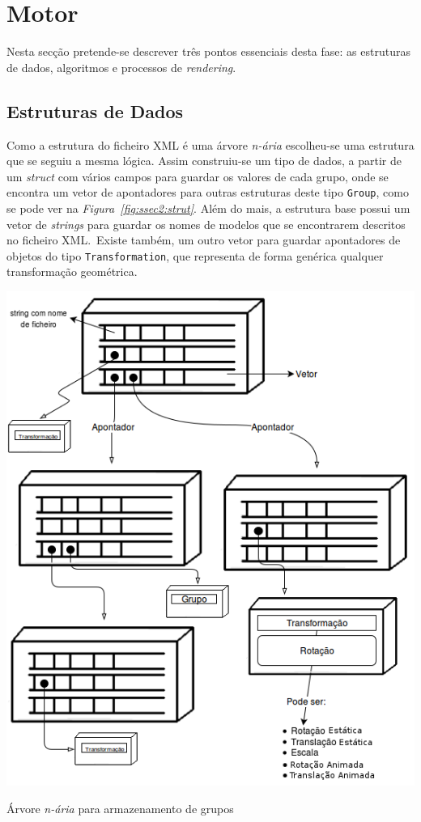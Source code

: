 \section{Motor}

Nesta secção pretende-se descrever três pontos essenciais desta fase: as
estruturas de dados, algoritmos e processos de \emph{rendering}.


\subsection{Estruturas de Dados}
\label{subsec:sec2}

Como a estrutura do ficheiro XML é uma árvore \emph{n-ária} escolheu-se uma
estrutura que se seguiu a mesma lógica. Assim construiu-se um tipo de dados,
a partir de um \emph{struct} com vários campos para guardar os valores de cada
grupo, onde se encontra um vetor de apontadores para outras estruturas deste
tipo \texttt{Group}, como se pode ver na \emph{Figura~\ref{fig:ssec2:strut}}.
Além do mais, a estrutura base possui um vetor de \emph{strings} para guardar
os nomes de modelos que se encontrarem descritos no ficheiro XML.\ Existe também,
um outro vetor para guardar apontadores de objetos do tipo
\texttt{Transformation}, que representa de forma genérica qualquer transformação
geométrica.

\begin{center} 	
\includegraphics[width=\textwidth,height=\textheight,keepaspectratio]{resources/estrutura.png}
\captionsetup{type=figure, width=0.8\linewidth}
\caption{Árvore \emph{n-ária} para armazenamento de grupos}
\label{fig:ssec2:strut} 
\end{center}

